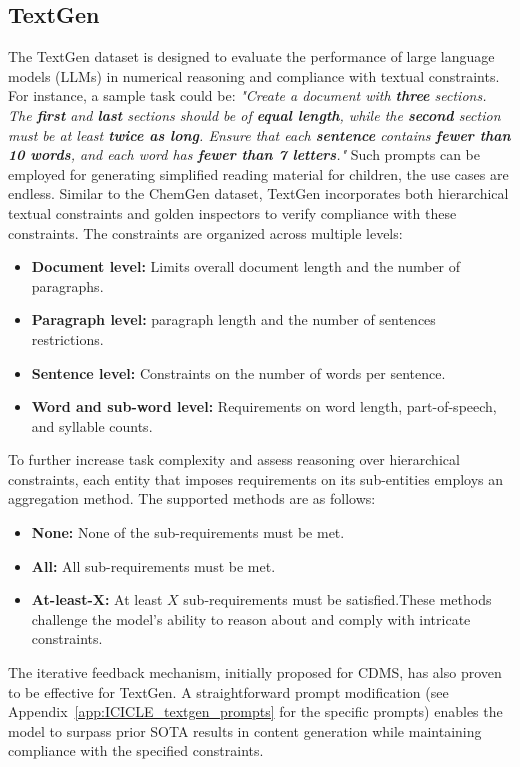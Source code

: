 \documentclass[10pt]{article} %
\begin{document}
    \subsection{TextGen}
    The TextGen dataset is designed to evaluate the performance of large language models (LLMs) in numerical reasoning and compliance with textual constraints. For instance, a sample task could be: \textit{"Create a document with \textbf{three} sections. The \textbf{first} and \textbf{last} sections should be of \textbf{equal length}, while the \textbf{second} section must be at least \textbf{twice as long}. Ensure that each \textbf{sentence} contains \textbf{fewer than 10 words}, and each word has \textbf{fewer than 7 letters}."}
    Such prompts can be employed for generating simplified reading material for children, the use cases are endless.
    Similar to the ChemGen dataset, TextGen incorporates both hierarchical textual constraints and golden inspectors to verify compliance with these constraints. The constraints are organized across multiple levels:
    \begin{itemize}
        \item \textbf{Document level:} Limits overall document length and the number of paragraphs. 
        \item \textbf{Paragraph level:} paragraph length and the number of sentences restrictions. 
        \item \textbf{Sentence level:} Constraints on the number of words per sentence.
        \item \textbf{Word and sub-word level:} Requirements on word length, part-of-speech, and syllable counts.
    \end{itemize}
    
    To further increase task complexity and assess reasoning over hierarchical constraints, each entity that imposes requirements on its sub-entities employs an aggregation method. The supported methods are as follows:
    \begin{itemize}
        \item \textbf{None:} None of the sub-requirements must be met.
        \item \textbf{All:} All sub-requirements must be met.
        \item \textbf{At-least-X:} At least $X$ sub-requirements must be satisfied.These methods challenge the model's ability to reason about and comply with intricate constraints.
    \end{itemize}
    
    The iterative feedback mechanism, initially proposed for CDMS, has also proven to be effective for TextGen. A straightforward prompt modification (see Appendix~\ref{app:ICICLE_textgen_prompts} for the specific prompts) enables the model to surpass prior SOTA results in content generation while maintaining compliance with the specified constraints.
        
\end{document}
